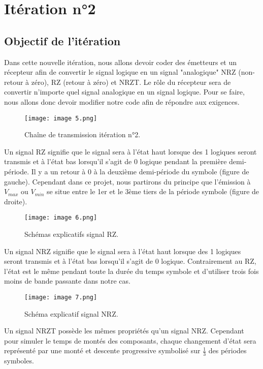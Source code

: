 \section{Itération n°2}
\subsection{Objectif de l'itération}

Dans cette nouvelle itération, nous allons devoir coder des émetteurs et un récepteur afin de convertir le signal logique en un signal "analogique" NRZ (non-retour à zéro), RZ (retour à zéro) et NRZT. Le rôle du récepteur sera de convertir n'importe quel signal analogique en un signal logique. Pour se faire, nous allons donc devoir modifier notre code afin de répondre aux exigences.

\begin{figure}[H]
    \centering
    \texttt{[image: image 5.png]}
    \caption{\label{fig:image5}Chaîne de transmission itération n°2.}
\end{figure}

Un signal RZ signifie que le signal sera à l'état haut lorsque des 1 logiques seront transmis et à l'état bas lorsqu'il s'agit de 0 logique pendant la première demi-période. Il y a un retour à 0 à la deuxième demi-période du symbole (figure de gauche). Cependant dans ce projet, nous partirons du principe que l'émission à $V_{max}$ ou $V_{min}$ se situe entre le 1er et le 3ème tiers de la période symbole (figure de droite).

\begin{figure}[H]
    \centering
    \texttt{[image: image 6.png]}
    \caption{\label{fig:image6}Schémas explicatifs signal RZ.}
\end{figure}

Un signal NRZ signifie que le signal sera à l'état haut lorsque des 1 logiques seront transmis et à l'état bas lorsqu'il s'agit de 0 logique. Contrairement au RZ, l'état est le même pendant toute la durée du temps symbole et d'utiliser trois fois moins de bande passante dans notre cas.

\begin{figure}[H]
    \centering
    \texttt{[image: image 7.png]}
    \caption{\label{fig:image7}Schéma explicatif signal NRZ.}
\end{figure}

Un signal NRZT possède les mêmes propriétés qu'un signal NRZ. Cependant pour simuler le temps de montés des composants, chaque changement d'état sera représenté par une monté et descente progressive symbolisé sur $\frac{1}{3}$ des périodes symboles.

